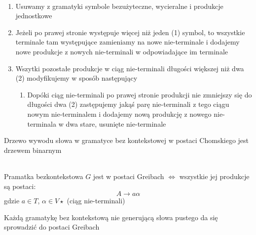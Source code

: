 	\begin{alg}~\\
		\begin{enumerate}
			\item Usuwamy z gramatyki symbole bezużyteczne, wycieralne i produkcje jednostkowe
			\item Jeżeli po prawej stronie występuje więcej niż jeden (1) symbol, to wszystkie
			terminale tam występujące zamieniamy na nowe nie-terminale i dodajemy
			nowe produkcje z nowych nie-terminali w odpowiadające im terminale
			\item Wszytki pozostałe produkcje w ciąg nie-terminali długości większej niż dwa (2)
			modyfikujemy w sposób następujący
				\begin{enumerate}
					\item Dopóki ciąg nie-terminali po prawej stronie produkcji nie zmniejszy się do długości dwa (2)
					zastępujemy jakąś parę nie-terminali z tego ciągu nowym nie-terminalem i dodajemy nową produkcję
					z nowego nie-terminala w dwa stare, usunięte nie-terminale
				\end{enumerate}
		\end{enumerate}
	\end{alg}
	
	\begin{uwaga}
		Drzewo wywodu słowa w gramatyce bez kontekstowej w postaci Chomskiego jest drzewem binarnym
	\end{uwaga}
	
	\begin{df}~\\
		Pramatka bezkontekstowa $G$ jest w postaci Greibach $\Leftrightarrow$ wszystkie jej produkcje są postaci:
		\begin{equation}
			A \rightarrow a\alpha
		\end{equation}
		gdzie $a\in T$, $\alpha \in V\star$ (ciąg nie-terminali)
	\end{df}
	
	\begin{lemat}
		Każdą gramatykę bez kontekstową nie generującą słowa pustego da się sprowadzić do postaci Greibach
	\end{lemat}
	
